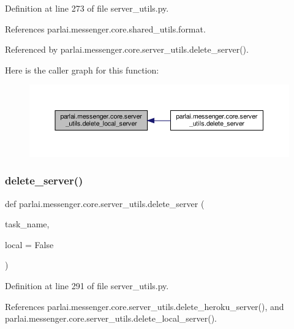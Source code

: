 Definition at line 273 of file server\+\_\+utils.\+py.



References parlai.\+messenger.\+core.\+shared\+\_\+utils.\+format.



Referenced by parlai.\+messenger.\+core.\+server\+\_\+utils.\+delete\+\_\+server().

Here is the caller graph for this function\+:
\nopagebreak
\begin{figure}[H]
\begin{center}
\leavevmode
\includegraphics[width=350pt]{namespaceparlai_1_1messenger_1_1core_1_1server__utils_a0c2ab25112f98f6d7f95174f8f55f4fa_icgraph}
\end{center}
\end{figure}
\mbox{\label{namespaceparlai_1_1messenger_1_1core_1_1server__utils_a606f5ec3e035a05cae9d1b44ff88fdde}} 
\subsubsection{\texorpdfstring{delete\+\_\+server()}{delete\_server()}}
{\footnotesize\ttfamily def parlai.\+messenger.\+core.\+server\+\_\+utils.\+delete\+\_\+server (\begin{DoxyParamCaption}\item[{}]{task\+\_\+name,  }\item[{}]{local = {\ttfamily False} }\end{DoxyParamCaption})}



Definition at line 291 of file server\+\_\+utils.\+py.



References parlai.\+messenger.\+core.\+server\+\_\+utils.\+delete\+\_\+heroku\+\_\+server(), and parlai.\+messenger.\+core.\+server\+\_\+utils.\+delete\+\_\+local\+\_\+server().

